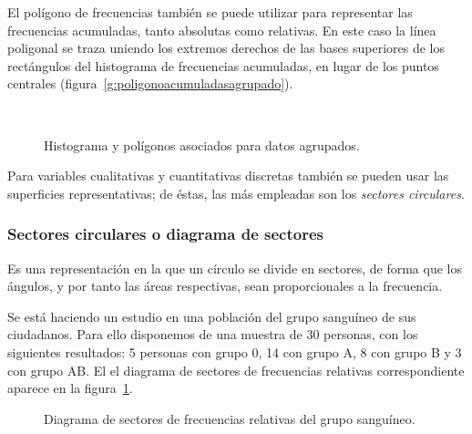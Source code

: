 El polígono de frecuencias también se puede utilizar para representar las frecuencias acumuladas, tanto absolutas como
relativas. En este caso la línea poligonal se traza uniendo los extremos derechos de las bases superiores de los
rectángulos del histograma de frecuencias acumuladas, en lugar de los puntos centrales
(figura~\ref{g:poligonoacumuladasagrupado}).

\begin{figure}[h!]
\centering
{}\qquad
{}\\
\qquad
{}
\caption{Histograma y polígonos asociados para datos agrupados.}
\end{figure}

Para variables cualitativas y cuantitativas discretas también se pueden usar las superficies representativas; de éstas,
las más empleadas son los \emph{sectores circulares}.


\subsubsection{Sectores circulares o diagrama de sectores}
Es una representación en la que un círculo se divide en sectores, de forma que los ángulos, y por tanto las áreas
respectivas, sean proporcionales a la frecuencia.

\begin{ejemplo}
Se está haciendo un estudio en una población del grupo sanguíneo de sus ciudadanos. Para ello disponemos
de una muestra de 30 personas, con los siguientes resultados: 5 personas con grupo 0, 14 con grupo A, 8 con grupo B y  3 con grupo AB.
El el diagrama de sectores de frecuencias relativas correspondiente aparece en la figura~\ref{g:diagramasectoresgruposanguineo}.

\begin{figure}[h!]
\centering
\scalebox{0.7}{}
\caption{Diagrama de sectores de frecuencias relativas del grupo sanguíneo.}
\label{g:diagramasectoresgruposanguineo}
\end{figure}
\end{ejemplo}


